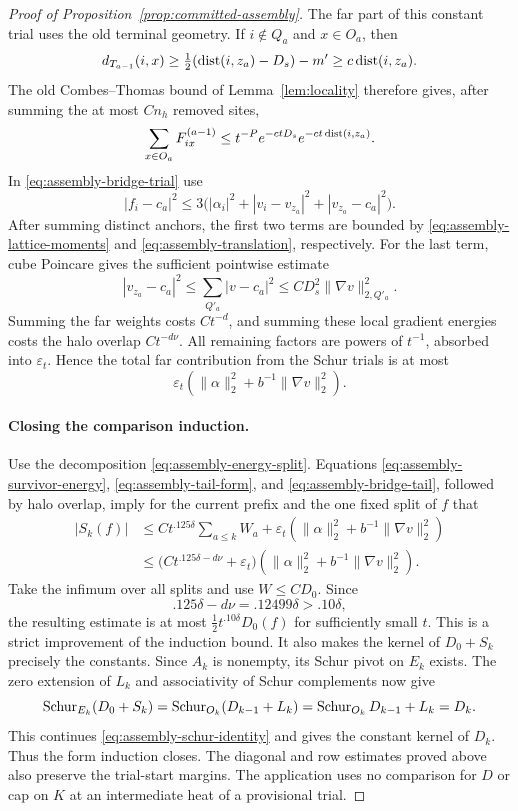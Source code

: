 \begin{proof}[Proof of Proposition~\ref{prop:committed-assembly}]
The far part of this constant trial uses the old terminal geometry.
If $i\notin Q_a$ and $x\in O_a$, then
\[
 d_{T_{a-1}}(i,x)\ge\tfrac12(\operatorname{dist}(i,z_a)-D_s)-m'
          \ge c\operatorname{dist}(i,z_a).
\]
The old Combes--Thomas bound of Lemma~\ref{lem:locality} therefore
gives, after summing the at most $Cn_h$ removed sites,
\[
 \sum_{x\in O_a}F^{(a-1)}_{ix}
 \le t^{-P}e^{-ctD_s}e^{-ct\operatorname{dist}(i,z_a)}.
\]
In \eqref{eq:assembly-bridge-trial} use
\[
 |f_i-c_a|^2\le3\bigl(|\alpha_i|^2+|v_i-v_{z_a}|^2
                              +|v_{z_a}-c_a|^2\bigr).
\]
After summing distinct anchors, the first two terms are bounded
by \eqref{eq:assembly-lattice-moments} and
\eqref{eq:assembly-translation}, respectively.  For the last term,
cube Poincare gives the sufficient pointwise estimate
\[
 |v_{z_a}-c_a|^2
 \le\sum_{Q'_a}|v-c_a|^2
 \le CD_s^2\|\nabla v\|_{2,Q'_a}^2.
\]
Summing the far weights costs $Ct^{-d}$, and summing these local
gradient energies costs the halo overlap $Ct^{-d\nu}$.  All
remaining factors are powers of $t^{-1}$, absorbed into
$\varepsilon_t$.  Hence the total far contribution from the
Schur trials is at most
\begin{equation}
 \varepsilon_t(\|\alpha\|_2^2+b^{-1}\|\nabla v\|_2^2).
 \label{eq:assembly-bridge-tail}
\end{equation}

\paragraph{Closing the comparison induction.}
Use the decomposition \eqref{eq:assembly-energy-split}. Equations
\eqref{eq:assembly-survivor-energy},
\eqref{eq:assembly-tail-form}, and
\eqref{eq:assembly-bridge-tail}, followed by halo overlap, imply
for the current prefix and the one fixed split of $f$ that
\begin{align*}
 |S_k(f)|
 &\le Ct^{.125\delta}\sum_{a\le k}W_a
       +\varepsilon_t(\|\alpha\|_2^2+b^{-1}\|\nabla v\|_2^2)\\
 &\le\bigl(Ct^{.125\delta-d\nu}+\varepsilon_t\bigr)
       (\|\alpha\|_2^2+b^{-1}\|\nabla v\|_2^2).
\end{align*}
Take the infimum over all splits and use $W\le C D_0$.
Since
\[
 .125\delta-d\nu=.12499\delta>.10\delta,
\]
the resulting estimate is at most
$\tfrac12t^{.10\delta}D_0(f)$ for sufficiently small $t$.
This is a strict improvement of the induction bound. It also makes the
kernel of $D_0+S_k$ precisely the constants. Since $A_k$ is nonempty,
its Schur pivot on $E_k$ exists. The zero extension of $L_k$ and
associativity of Schur complements now give
\[
 \operatorname{Schur}_{E_k}(D_0+S_k)
 =\operatorname{Schur}_{O_k}(D_{k-1}+L_k)
 =\operatorname{Schur}_{O_k}D_{k-1}+L_k=D_k.
\]
This continues \eqref{eq:assembly-schur-identity} and gives the constant
kernel of $D_k$. Thus the form induction closes. The diagonal and row
estimates proved above also preserve the trial-start margins. The
application uses no comparison for $D$ or cap on $K$ at an intermediate
heat of a provisional trial.


\end{proof}
